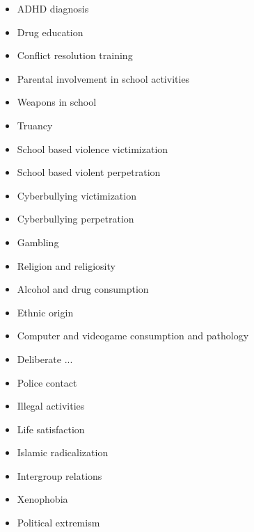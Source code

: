 \begin{multicols}{3}
\begin{itemize}
		\item ADHD diagnosis
		\item Drug education
		\item Conflict resolution training
		\item Parental involvement in school activities
		\item Weapons in school
		\item Truancy
		\item School based violence victimization
		\item School based violent perpetration
		\item Cyberbullying victimization
		\item Cyberbullying perpetration
		\item Gambling
		\item Religion and religiosity
		\item Alcohol and drug consumption
		\item Ethnic origin
		\item Computer and videogame consumption and pathology
		\item Deliberate ...
		\item Police contact
		\item Illegal activities
		\item Life satisfaction
		\item Islamic radicalization
		\item Intergroup relations
		\item Xenophobia
		\item Political extremism
	\end{itemize}
\end{multicols}